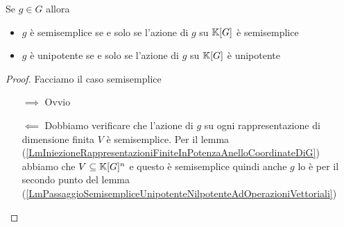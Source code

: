 \begin{corollary}\label{CorControlloSemisempliceSuAnelloCoordinate}
Se $g\in G$ allora
\begin{itemize}
    \item $g$ \`e semisemplice se e solo se l'azione di $g$ su $\mathbb{K}[G]$ \`e semisemplice
    \item $g$ \`e unipotente se e solo se l'azione di $g$ su $\mathbb{K}[G]$ \`e unipotente
\end{itemize}
\end{corollary}
\begin{proof}
Facciamo il caso semisemplice
\setlength{\leftmargini}{0cm}
\begin{itemize}
\item[$\boxed{\implies}$] Ovvio
\item[$\boxed{\impliedby}$] Dobbiamo verificare che l'azione di $g$ su ogni rappresentazione di dimensione finita $V$ \`e semisemplice. Per il lemma (\ref{LmIniezioneRappresentazioniFiniteInPotenzaAnelloCoordinateDiG}) abbiamo che $V\subseteq \mathbb{K}[G]^n$ e questo \`e semisemplice quindi anche $g$ lo \`e per il secondo punto del lemma (\ref{LmPassaggioSemisempliceUnipotenteNilpotenteAdOperazioniVettoriali}) 
\end{itemize}
\setlength{\leftmargini}{0.5cm}
\end{proof}



